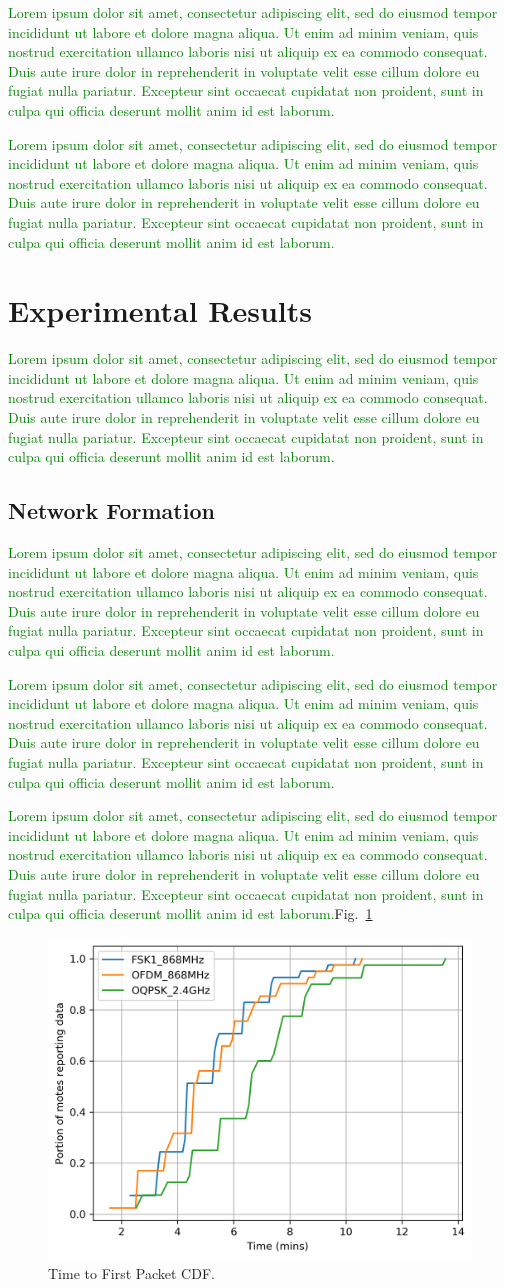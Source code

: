 \documentclass[journal]{IEEEtran}
\newcommand{\lorem}        {\textcolor{green}{Lorem ipsum dolor sit amet, consectetur adipiscing elit, sed do eiusmod tempor incididunt ut labore et dolore magna aliqua. Ut enim ad minim veniam, quis nostrud exercitation ullamco laboris nisi ut aliquip ex ea commodo consequat. Duis aute irure dolor in reprehenderit in voluptate velit esse cillum dolore eu fugiat nulla pariatur. Excepteur sint occaecat cupidatat non proident, sunt in culpa qui officia deserunt mollit anim id est laborum.}}
\begin{document}

\lorem


\lorem

\section{Experimental Results}
\label{sec:results}

\lorem

\subsection{Network Formation}
\label{sec:network_formation}


\lorem


\lorem


\lorem Fig.~\ref{fig:time_firstpacket_cdf}

\begin{figure}
	\centering
	\includegraphics[width=0.90\columnwidth]{time_firstpacket_cdf}
	\caption{Time to First Packet CDF.}
    \label{fig:time_firstpacket_cdf}
\end{figure}

\end{document}
